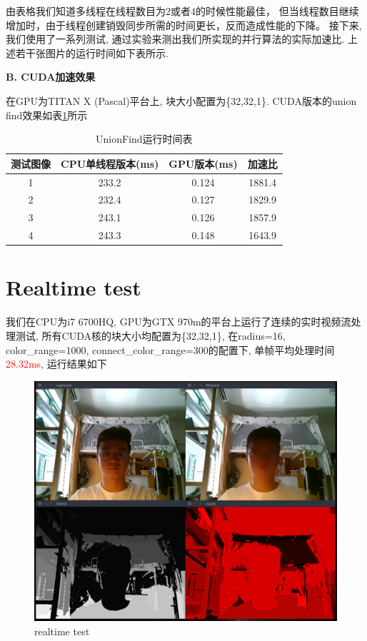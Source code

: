 \documentclass[a4paper, 11pt]{article}
\begin{document}
    由表格我们知道多线程在线程数目为2或者4的时候性能最佳，
    但当线程数目继续增加时，由于线程创建销毁同步所需的时间更长，反而造成性能的下降。
接下来, 我们使用了一系列测试, 通过实验来测出我们所实现的并行算法的实际加速比. 
上述若干张图片的运行时间如下表所示.

\textbf{B. CUDA加速效果}

在GPU为TITAN X (Pascal)平台上, 块大小配置为\{32,32,1\}. CUDA版本的union find效果如表\ref{tb:union_find}所示
\begin{table}[H]
	\centering
	\begin{tabular}{cccc}
		\hline
		测试图像 & CPU单线程版本(ms) & GPU版本(ms) & 加速比 \\ \hline
		1       & 233.2           & 0.124       & 1881.4 \\ \hline
		2       & 232.4           & 0.127       & 1829.9\\ \hline
		3       & 243.1           & 0.126       & 1857.9 \\ \hline
		4       & 243.3           & 0.148      & 1643.9 \\ \hline
	\end{tabular}
	\caption{UnionFind运行时间表}
	\label{tb:union_find}
\end{table}


\clearpage
\section{Realtime test}
我们在CPU为i7 6700HQ, GPU为GTX 970m的平台上运行了连续的实时视频流处理测试, 所有CUDA核的块大小均配置为\{32,32,1\}, 在radius=16, color\_range=1000, connect\_color\_range=300的配置下, 单帧平均处理时间\textcolor{red}{28.32ms}, 运行结果如下

\begin{figure}[H]
	\centering
	\includegraphics[width=1\linewidth]{images/realtime}
	\caption{realtime test}
	\label{fig:realtime}
\end{figure}
\end{document}
